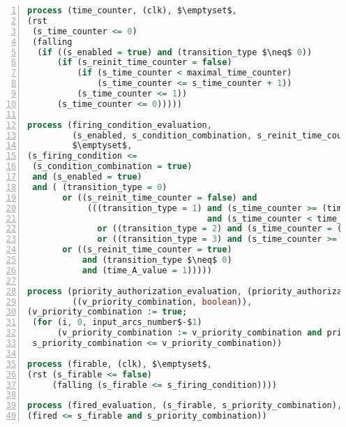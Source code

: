 \begin{lstlisting}[language=VHDL,label={lst:trans-design-abss},caption={The \texttt{transition} design in \hvhdl{} abstract syntax.},framexleftmargin=1.5em,xleftmargin=2em,numbers=left, numberstyle=\tiny\ttfamily]
process (time_counter, (clk), $\emptyset$,
(rst 
 (s_time_counter <= 0)
 (falling
  (if ((s_enabled = true) and (transition_type $\neq$ 0)) 
      (if (s_reinit_time_counter = false)
          (if (s_time_counter < maximal_time_counter)
              (s_time_counter <= s_time_counter + 1))
          (s_time_counter <= 1))
      (s_time_counter <= 0)))))

process (firing_condition_evaluation, 
         (s_enabled, s_condition_combination, s_reinit_time_counter, s_time_counter),
         $\emptyset$,
(s_firing_condition <= 
 (s_condition_combination = true)
 and (s_enabled = true)
 and ( (transition_type = 0)
       or ((s_reinit_time_counter = false) and
            (((transition_type = 1) and (s_time_counter >= (time_A_value-1)) 
                                    and (s_time_counter < time_B_value))
              or ((transition_type = 2) and (s_time_counter = (time_A_value-1)))
              or ((transition_type = 3) and (s_time_counter >= (time_A_value-1)))))                              
       or ((s_reinit_time_counter = true)
           and (transition_type $\neq$ 0)
           and (time_A_value = 1)))))
  
process (priority_authorization_evaluation, (priority_authorizations),
         ((v_priority_combination, boolean)),
(v_priority_combination := true;
 (for (i, 0, input_arcs_number$-$1)
      (v_priority_combination := v_priority_combination and priority_authorizations(i)));
 s_priority_combination <= v_priority_combination))

process (firable, (clk), $\emptyset$,
(rst (s_firable <= false)
     (falling (s_firable <= s_firing_condition))))

process (fired_evaluation, (s_firable, s_priority_combination), $\emptyset$,
(fired <= s_firable and s_priority_combination))
\end{lstlisting}

